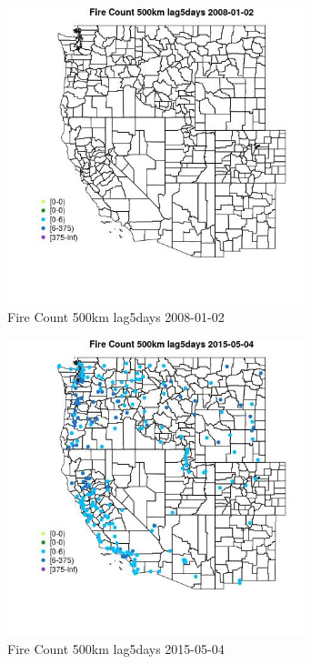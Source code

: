\begin{figure} 
\centering  
\includegraphics[width=0.77\textwidth]{Code_Outputs/Report_ML_input_PM25_Step4_part_e_de_duplicated_aves_compiled_2019-05-18wNAs_MapObsFire_Count_500km_lag5days2008-01-02.jpg} 
\caption{\label{fig:Report_ML_input_PM25_Step4_part_e_de_duplicated_aves_compiled_2019-05-18wNAsMapObsFire_Count_500km_lag5days2008-01-02}Fire Count 500km lag5days 2008-01-02} 
\end{figure} 
 

\begin{figure} 
\centering  
\includegraphics[width=0.77\textwidth]{Code_Outputs/Report_ML_input_PM25_Step4_part_e_de_duplicated_aves_compiled_2019-05-18wNAs_MapObsFire_Count_500km_lag5days2015-05-04.jpg} 
\caption{\label{fig:Report_ML_input_PM25_Step4_part_e_de_duplicated_aves_compiled_2019-05-18wNAsMapObsFire_Count_500km_lag5days2015-05-04}Fire Count 500km lag5days 2015-05-04} 
\end{figure} 
 

